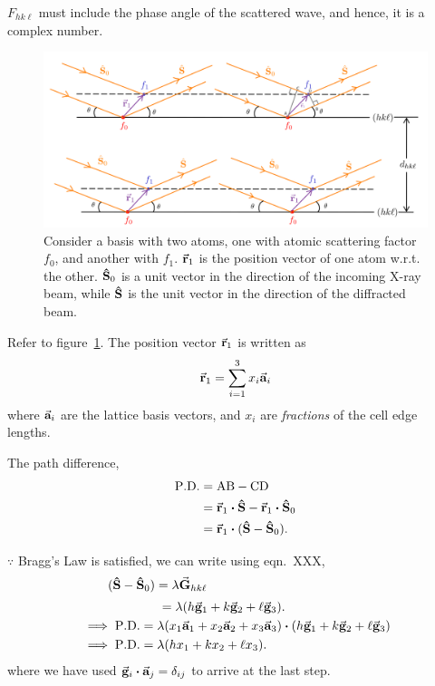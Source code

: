 	$F_{hk\ell}$ must include the phase angle of the scattered wave, and hence, it is a complex number.
	
	\begin{figure}
	\centering
	\includegraphics[scale=0.15]{structure_factor.png}
	\caption{\label{fig:struct_fact}Consider a basis with two atoms, one with atomic scattering factor $f_0$, and another with $f_1.$ $\va{r}_1$ is the position vector of one atom w.r.t. the other. $\vu{S}_0$ is a unit vector in the direction of the incoming X-ray beam, while $\vu{S}$ is the unit vector in the direction of the diffracted beam.}
	\end{figure}
	
	Refer to figure~\ref{fig:struct_fact}. The position vector $\va{r}_1$ is written as%
%	
	\begin{equation}
	\va{r}_1 = \sum_{i=1}^3 x_i \va{a}_i
	\end{equation}%
%	
	where $\va{a}_i$ are the lattice basis vectors, and $x_i$ are \textit{fractions} of the cell edge lengths.
	
	The path difference,%
%	
	\begin{align}
	\mathrm{P.D.} &= \mathrm{AB} - \mathrm{CD} \nonumber \\
				  &= \va{r}_1 \vdot \vu{S} - \va{r}_1 \vdot \vu{S}_0 \nonumber \\
				  &= \va{r}_1 \vdot ( \vu{S} - \vu{S}_0 ).
	\end{align}
	
	$\because$ Bragg's Law is satisfied, we can write using eqn.~XXX,%
%		
	\begin{align}
	&\phantom{\implies} ( \vu{S} - \vu{S}_0 ) = \lambda \va{G}_{hk\ell} \nonumber\\
	&\phantom{ \implies ( \vu{S} - \vu{S}_0 ) } = \lambda \qty( h \va{g}_1 + k \va{g}_2 + \ell \va{g}_3 ).\\
	&\implies \mathrm{P.D.} = \lambda \qty( x_1 \va{a}_1 + x_2 \va{a}_2 + x_3 \va{a}_3 ) \vdot \qty( h \va{g}_1 + k \va{g}_2 + \ell \va{g}_3 ) \nonumber \\
	&\implies \mathrm{P.D.} = \lambda \qty( h x_1 + k x_2 + \ell x_3 ).
	\end{align}%
%	
	where we have used $\va{g}_i \vdot \va{a}_j = \delta_{ij}$ to arrive at the last step.
	
